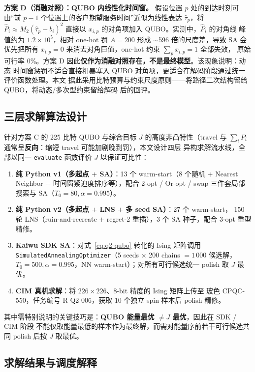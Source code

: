 \documentclass[UTF8,12pt,a4paper]{ctexart}
\begin{document}
\textbf{方案 D（消融对照）：QUBO 内线性化时间窗。} 假设位置 $p$ 处的到达时刻可由``前 $p-1$
个位置上的客户期望服务时间''近似为线性表达 $\hat\tau_p$，将 $\hat P_i\approx
M_2(\hat\tau_p-b_i)^{2}$ 直接以 $x_{i,p}$ 的对角项加入 QUBO。实测中，$\hat P_i$ 的对角线
峰值约为 $1.2\times 10^{5}$，相对 one-hot 罚 $A=200$ 形成 $\sim$596 倍的尺度差，导致 SA
会优先把所有 $x_{i,p}\!=\!0$ 来消去对角巨值，one-hot 约束 $\sum_p x_{i,p}=1$ 全部失效，
原始可行率 0\%。方案 D 因此\textbf{仅作为消融对照存在，不是最终模型}。该现象说明：动态
时间窗惩罚不适合直接粗暴塞入 QUBO 对角项，更适合在解码阶段通过统一评价函数处理。本文
据此采用比特预算与约束尺度原则——将路径二次结构留给 QUBO，将动态/多次型约束留给解码
后的回评。

\subsection{三层求解算法设计}
\label{subsec:q2-algo}

针对方案 C 的 225 比特 QUBO 与综合目标 $J$ 的高度非凸特性（$\mathrm{travel}$ 与
$\sum_i P_i$ 通常呈\textbf{反向}：缩短 $\mathrm{travel}$ 可能加剧晚到罚），本文设计四层
异构求解流水线，全部以同一 \texttt{evaluate} 函数评价 $J$ 以保证可比性：
\begin{enumerate}
  \item[(i)] \textbf{纯 Python v1（多起点 $+$ SA）}：13 个 warm-start（8 个随机 $+$
    Nearest Neighbor $+$ 时间窗紧迫度排序等），配合 2-opt / Or-opt / swap 三件套局部
    搜索与 SA（$T_0=80,\alpha=0.995$）。
  \item[(ii)] \textbf{纯 Python v2（多起点 $+$ LNS $+$ 多 seed SA）}：27 个 warm-start，
    150 轮 LNS（ruin-and-recreate $+$ regret-2 重插），3 个 SA 种子，配合 3-opt 重型精修。
  \item[(iii)] \textbf{Kaiwu SDK SA}：对式~\eqref{eq:q2-qubo} 转化的 Ising 矩阵调用
    \texttt{SimulatedAnnealingOptimizer}（5 seeds $\times$ 200 chains $=1\,000$ 候选解，
    $T_0=500,\alpha=0.995$，NN warm-start）；对所有可行候选统一 polish 取 $J$ 最优。
  \item[(iv)] \textbf{CIM 真机求解}：将 $226\times 226$、8-bit 精度的 Ising 矩阵上传至
    玻色 CPQC-550，任务编号 R-Q2-006，获取 10 个独立 spin 样本后 polish 精修。
\end{enumerate}
其中需特别说明的关键技巧是：\textbf{QUBO 能量最优 $\ne J$ 最优}，因此在 SDK / CIM 阶段
不能仅取能量最低的样本作为最终解，而需对能量序前若干可行候选共同 polish 后按 $J$ 取最优。

\subsection{求解结果与调度解释}
\label{subsec:q2-result}
\end{document}
